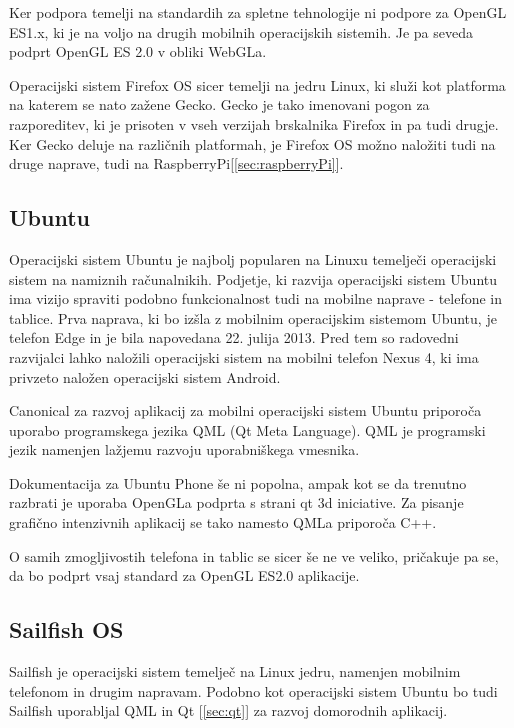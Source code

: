 Ker podpora temelji na standardih za spletne tehnologije ni podpore za OpenGL ES1.x, ki je na voljo na drugih mobilnih operacijskih sistemih. Je pa seveda podprt OpenGL ES 2.0 v obliki WebGLa.

Operacijski sistem Firefox OS sicer temelji na jedru Linux, ki služi kot platforma na katerem se nato zažene Gecko. Gecko je tako imenovani pogon za razporeditev, ki je prisoten v vseh verzijah brskalnika Firefox in pa tudi drugje. Ker Gecko deluje na različnih platformah, je Firefox OS možno naložiti tudi na druge naprave, tudi na RaspberryPi[\ref{sec:raspberryPi}]. 

\subsection{Ubuntu}

Operacijski sistem Ubuntu je najbolj popularen na Linuxu temelječi operacijski sistem na namiznih računalnikih. Podjetje, ki razvija operacijski sistem Ubuntu ima vizijo spraviti podobno funkcionalnost tudi na mobilne naprave - telefone in tablice. Prva naprava, ki bo izšla z mobilnim operacijskim sistemom Ubuntu, je telefon Edge in je bila napovedana 22. julija 2013. Pred tem so radovedni razvijalci lahko naložili operacijski sistem na mobilni telefon Nexus 4, ki ima privzeto naložen operacijski sistem Android.

Canonical za razvoj aplikacij za mobilni operacijski sistem Ubuntu priporoča uporabo programskega jezika QML (Qt Meta Language). QML je programski jezik namenjen lažjemu razvoju uporabniškega vmesnika. 

Dokumentacija za Ubuntu Phone še ni popolna, ampak kot se da trenutno razbrati je uporaba OpenGLa podprta s strani qt 3d iniciative. Za pisanje grafično intenzivnih aplikacij se tako namesto QMLa priporoča C++.

O samih zmogljivostih telefona in tablic se sicer še ne ve veliko, pričakuje pa se, da bo podprt vsaj standard za OpenGL ES2.0 aplikacije. 

\subsection{Sailfish OS}

Sailfish je operacijski sistem temelječ na Linux jedru, namenjen mobilnim telefonom in drugim napravam. Podobno kot operacijski sistem Ubuntu bo tudi Sailfish uporabljal QML in Qt [\ref{sec:qt}] za razvoj domorodnih aplikacij.

